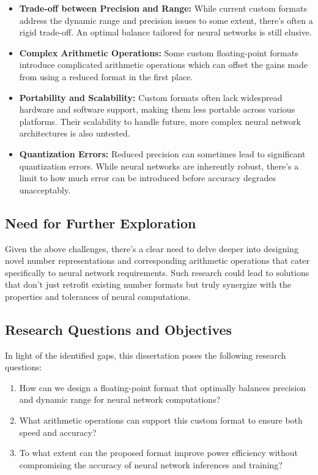 \begin{itemize}
	\item \textbf{Trade-off between Precision and Range:} While current custom formats address the dynamic range and precision issues to some extent, there's often a rigid trade-off. An optimal balance tailored for neural networks is still elusive.
	
	\item \textbf{Complex Arithmetic Operations:} Some custom floating-point formats introduce complicated arithmetic operations which can offset the gains made from using a reduced format in the first place.
	
	\item \textbf{Portability and Scalability:} Custom formats often lack widespread hardware and software support, making them less portable across various platforms. Their scalability to handle future, more complex neural network architectures is also untested.
	
	\item \textbf{Quantization Errors:} Reduced precision can sometimes lead to significant quantization errors. While neural networks are inherently robust, there's a limit to how much error can be introduced before accuracy degrades unacceptably.
\end{itemize}

\subsection{Need for Further Exploration}

Given the above challenges, there's a clear need to delve deeper into designing novel number representations and corresponding arithmetic operations that cater specifically to neural network requirements. Such research could lead to solutions that don't just retrofit existing number formats but truly synergize with the properties and tolerances of neural computations.

\subsection{Research Questions and Objectives}

In light of the identified gaps, this dissertation poses the following research questions:

\begin{enumerate}
	\item How can we design a floating-point format that optimally balances precision and dynamic range for neural network computations?
	\item What arithmetic operations can support this custom format to ensure both speed and accuracy?
	\item To what extent can the proposed format improve power efficiency without compromising the accuracy of neural network inferences and training?
\end{enumerate}

